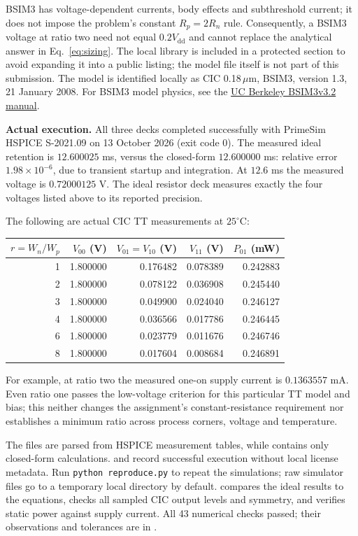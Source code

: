 \documentclass[11pt,a4paper]{article}
\newcommand{\VDD}{V_{\mathrm{dd}}}
\begin{document}
BSIM3 has voltage-dependent currents, body effects and subthreshold current;
it does not impose the problem's constant $R_p=2R_n$ rule.
Consequently, a BSIM3 voltage at ratio two need not equal $0.2\VDD$ and cannot
replace the analytical answer in Eq.~\eqref{eq:sizing}.
The local library is included in a protected section to avoid expanding it
into a public listing; the model file itself is not part of this submission.
The model is identified locally as CIC 0.18\,$\mu$m, BSIM3, version 1.3,
21 January 2008. For BSIM3 model physics, see the
\href{https://www2.eecs.berkeley.edu/Pubs/TechRpts/1998/ERL-98-51.pdf}{UC Berkeley BSIM3v3.2 manual}.

\textbf{Actual execution.} All three decks completed successfully with
PrimeSim HSPICE S-2021.09 on 13 October 2026 (exit code 0).
The measured ideal retention is $12.600025$ ms, versus the closed-form
$12.600000$ ms: relative error $1.98\times10^{-6}$, due to transient startup
and integration. At $12.6$ ms the measured voltage is $0.72000125$ V.
The ideal resistor deck measures exactly the four voltages listed above
to its reported precision.

The following are actual CIC TT measurements at $25^\circ$C:
\begin{center}
\begin{tabular}{rrrrr}
\toprule
$r=W_n/W_p$ & $V_{00}$ (V) & $V_{01}=V_{10}$ (V) & $V_{11}$ (V) & $P_{01}$ (mW) \\
\midrule
1 & 1.800000 & 0.176482 & 0.078389 & 0.242883 \\
2 & 1.800000 & 0.078122 & 0.036908 & 0.245440 \\
3 & 1.800000 & 0.049900 & 0.024040 & 0.246127 \\
4 & 1.800000 & 0.036566 & 0.017786 & 0.246445 \\
6 & 1.800000 & 0.023779 & 0.011676 & 0.246746 \\
8 & 1.800000 & 0.017604 & 0.008684 & 0.246891 \\
\bottomrule
\end{tabular}
\end{center}
For example, at ratio two the measured one-on supply current is
$0.1363557$ mA. Even ratio one passes the low-voltage criterion for this
particular TT model and bias; this neither changes the assignment's
constant-resistance requirement nor establishes a minimum ratio across
process corners, voltage and temperature.

The files  are parsed from HSPICE measurement
tables, while  contains only closed-form
calculations.  and
 record successful execution without local
license metadata. Run \texttt{python reproduce.py} to repeat the simulations;
raw simulator files go to a temporary local directory by default.
 compares the ideal results to the equations,
checks all sampled CIC output levels and symmetry, and verifies static
power against supply current. All 43 numerical checks passed; their
observations and tolerances are in .
\end{document}
